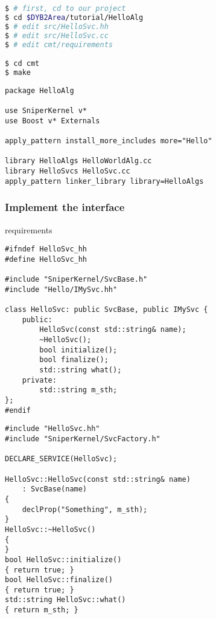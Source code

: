 \newsavebox{\implinterfacesh}
\begin{lrbox}{\implinterfacesh}
\begin{lstlisting}[language=bash]
$ # first, cd to our project
$ cd $DYB2Area/tutorial/HelloAlg
$ # edit src/HelloSvc.hh
$ # edit src/HelloSvc.cc
$ # edit cmt/requirements

$ cd cmt
$ make
\end{lstlisting}
\end{lrbox}
\newsavebox{\implinterfacereq}
\begin{lrbox}{\implinterfacereq}
\begin{lstlisting}
package HelloAlg

use SniperKernel v*
use Boost v* Externals

apply_pattern install_more_includes more="Hello" 

library HelloAlgs HelloWorldAlg.cc
library HelloSvcs HelloSvc.cc
apply_pattern linker_library library=HelloAlgs
\end{lstlisting}
\end{lrbox}

\begin{frame}
    \frametitle{Implement the interface}
    \par\usebox{\implinterfacesh}
    \begin{block}{requirements}
    \par\usebox{\implinterfacereq}
    \end{block}
\end{frame}

\newsavebox{\implinterfaceheader}
\begin{lrbox}{\implinterfaceheader}
\begin{lstlisting}
#ifndef HelloSvc_hh
#define HelloSvc_hh

#include "SniperKernel/SvcBase.h"
#include "Hello/IMySvc.hh"

class HelloSvc: public SvcBase, public IMySvc {
    public:
        HelloSvc(const std::string& name);
        ~HelloSvc();
        bool initialize();
        bool finalize();
        std::string what();
    private:
        std::string m_sth;
};
#endif
\end{lstlisting}
\end{lrbox}
\newsavebox{\implinterfaceimpl}
\begin{lrbox}{\implinterfaceimpl}
\begin{lstlisting}[linebackgroundcolor={\ifnum\value{lstnumber}=4\color{green}\fi}]
#include "HelloSvc.hh"
#include "SniperKernel/SvcFactory.h"

DECLARE_SERVICE(HelloSvc);

HelloSvc::HelloSvc(const std::string& name)
    : SvcBase(name)
{
    declProp("Something", m_sth);
}
HelloSvc::~HelloSvc()
{
}
bool HelloSvc::initialize()
{ return true; }
bool HelloSvc::finalize()
{ return true; }
std::string HelloSvc::what()
{ return m_sth; }
\end{lstlisting}
\end{lrbox}

